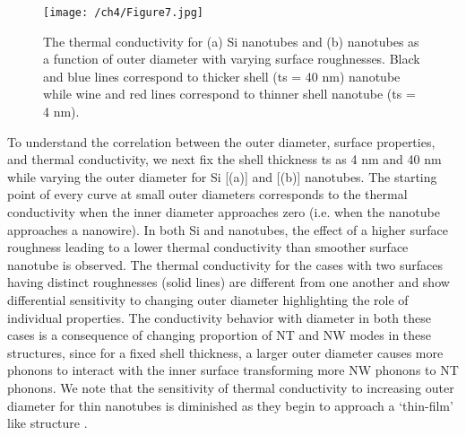 \begin{figure}[hbt]
	\texttt{[image: /ch4/Figure7.jpg]}
	\caption{The thermal conductivity for (a) Si nanotubes and (b)  nanotubes as a function of outer diameter with varying surface roughnesses. Black and blue lines correspond to thicker shell (\gls{ts} = 40 nm) nanotube while wine and red lines correspond to thinner shell nanotube (\gls{ts} = 4 nm).}
	\label{fig:nt_fig7}
\end{figure}

To understand the correlation between the outer diameter, surface properties, and thermal conductivity, we next fix the shell thickness \gls{ts} as 4 nm and 40 nm while varying the outer diameter for Si [(a)] and  [(b)] nanotubes. The starting point of every curve at small outer diameters corresponds to the thermal conductivity when the inner diameter approaches zero (i.e. when the nanotube approaches a nanowire). In both Si and  nanotubes, the effect of a higher surface roughness leading to a lower thermal conductivity than smoother surface nanotube is observed. The thermal conductivity for the cases with two surfaces having distinct roughnesses (solid lines) are different from one another and show differential sensitivity to changing outer diameter highlighting the role of individual properties. The conductivity behavior with diameter in both these cases is a consequence of changing proportion of NT and NW modes in these structures, since for a fixed shell thickness, a larger outer diameter causes more phonons to interact with the inner surface transforming more NW phonons to NT phonons. We note that the sensitivity of thermal conductivity to increasing outer diameter for thin nanotubes is diminished as they begin to approach a ‘thin-film’ like structure \cite{RN431}.

